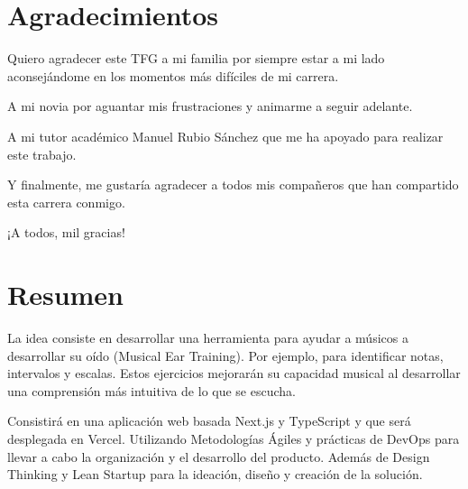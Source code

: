 \documentclass[12pt,twoside,titlepage]{report}
\newcommand\blankpage{%
    \newpage
    \null
    \thispagestyle{empty}%
    \newpage}
\begin{document}
\hypersetup{pageanchor=true}
\normalsize
\afterpage{\blankpage}
 
\setlength{\parskip}{0.75em}
\renewcommand{\baselinestretch}{1.25}

\setcounter{page}{2}


 

\chapter*{Agradecimientos}

Quiero agradecer este TFG a mi familia por siempre estar a mi lado aconsejándome en los momentos más difíciles de mi carrera. 

A mi novia por aguantar mis frustraciones y animarme a seguir adelante. 

A mi tutor académico Manuel Rubio Sánchez que me ha apoyado para realizar este trabajo. 

Y finalmente, me gustaría agradecer a todos mis compañeros que han compartido esta carrera conmigo.

¡A todos, mil gracias!
\afterpage{\blankpage}


 

\chapter*{Resumen}
La idea consiste en desarrollar una herramienta para ayudar a músicos a desarrollar su oído (Musical Ear Training). Por ejemplo, para identificar notas, intervalos y escalas. Estos ejercicios mejorarán su capacidad musical al desarrollar una comprensión más intuitiva de lo que se escucha.

Consistirá en una aplicación web basada Next.js y TypeScript y que será desplegada en Vercel. Utilizando Metodologías Ágiles y prácticas de DevOps para llevar a cabo la organización y el desarrollo del producto. Además de Design Thinking y Lean Startup para la ideación, diseño y creación de la solución.
\end{document}
